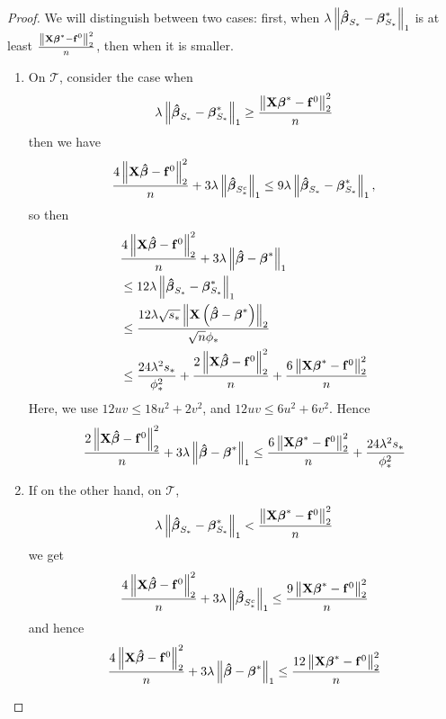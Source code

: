 \begin{proof}
    We will distinguish between two cases: first, when \(\lambda\left\|\boldsymbol{\hat{\beta}}_{S_{*}}-\boldsymbol{\beta}_{S_{*}}^{*}\right\|_{1}\) is at least \(\frac{\left\|\mathbf{X} \boldsymbol{\beta}^{*}-\mathbf{f}^{0}\right\|_{2}^{2}}{n}\), then when it is smaller.
    \begin{enumerate}
        \item On $\mathscr{T}$, consider the case when
              \[
                  \lambda\left\|\boldsymbol{\hat{\beta}}_{S_{*}}-\boldsymbol{\beta}_{S_{*}}^{*}\right\|_{1} \geq \frac{\left\|\mathbf{X} \boldsymbol{\beta}^{*}-\mathbf{f}^{0}\right\|_{2}^{2}}{n}
              \]
              then we have
              \[
                \frac{4\left\|\mathbf{X} \boldsymbol{\hat{\beta}}-\mathbf{f}^{0}\right\|_{2}^{2}}{n}+3 \lambda\left\|\boldsymbol{\hat{\beta}}_{S_{*}^{c}}\right\|_{1} \leq 9 \lambda\left\|\boldsymbol{\hat{\beta}}_{S_{*}}-\boldsymbol{\beta}_{S_{*}}^{*}\right\|_{1},
              \]
              so then
              \begin{align*}
                  & \frac{4\left\|\mathbf{X} \boldsymbol{\hat{\beta}}-\mathbf{f}^{0}\right\|_{2}^{2}}{n} + 3 \lambda\left\|\boldsymbol{\hat{\beta}} - \boldsymbol{\beta}^{*}\right\|_{1} \\
                  & \leq 12 \lambda\left\|\boldsymbol{\hat{\beta}}_{S_{*}}-\boldsymbol{\beta}_{S_{*}}^{*}\right\|_{1} \\
                  & \leq \frac{12 \lambda \sqrt{s_{*}}\left\|\mathbf{X}\left(\boldsymbol{\hat{\beta}}-\boldsymbol{\beta}^{*}\right)\right\|_{2}}{\sqrt{n} \phi_{*}} \\
                  & \leq \frac{24 \lambda^{2} s_{*}}{\phi_{*}^{2}} + \frac{2\left\|\mathbf{X} \boldsymbol{\hat{\beta}}-\mathbf{f}^{0}\right\|_{2}^{2}}{n} + \frac{6\left\|\mathbf{X} \boldsymbol{\beta}^{*} - \mathbf{f}^{0}\right\|_{2}^{2}}{n}
              \end{align*}
              Here, we use $12 u v \leq 18 u^{2}+2 v^{2}$, and $12 u v \leq 6 u^{2}+6 v^{2}$. Hence
              \[
                \frac{2\left\|\mathbf{X} \boldsymbol{\hat{\beta}}-\mathbf{f}^{0}\right\|_{2}^{2}}{n} + 3 \lambda\left\|\boldsymbol{\hat{\beta}}-\boldsymbol{\beta}^{*}\right\|_{1} \leq \frac{6\left\|\mathbf{X} \boldsymbol{\beta}^{*}-\mathbf{f}^{0}\right\|_{2}^{2}}{n} + \frac{24 \lambda^{2} s_{*}}{\phi_{*}^{2}}
              \]
        \item If on the other hand, on $\mathscr{T}$,
              \[
                  \lambda\left\|\boldsymbol{\hat{\beta}}_{S_{*}}-\boldsymbol{\beta}_{S_{*}}^{*}\right\|_{1} < \frac{\left\|\mathbf{X} \boldsymbol{\beta}^{*}-\mathbf{f}^{0}\right\|_{2}^{2}}{n}
              \]
              we get
              \[
                \frac{4\left\|\mathbf{X} \boldsymbol{\hat{\beta}}-\mathbf{f}^{0}\right\|_{2}^{2}}{n} + 3 \lambda\left\|\boldsymbol{\hat{\beta}}_{S_{*}^{c}}\right\|_{1} \leq \frac{9\left\|\mathbf{X} \boldsymbol{\beta}^{*}-\mathbf{f}^{0}\right\|_{2}^{2}}{n}
              \]
              and hence
              \[
                \frac{4\left\|\mathbf{X} \boldsymbol{\hat{\beta}}-\mathbf{f}^{0}\right\|_{2}^{2}}{n} + 3 \lambda\left\|\boldsymbol{\hat{\beta}}-\boldsymbol{\beta}^{*}\right\|_{1} \leq \frac{12\left\|\mathbf{X} \boldsymbol{\beta}^{*}-\mathbf{f}^{0}\right\|_{2}^{2}}{n}
              \]
    \end{enumerate}
\end{proof}

